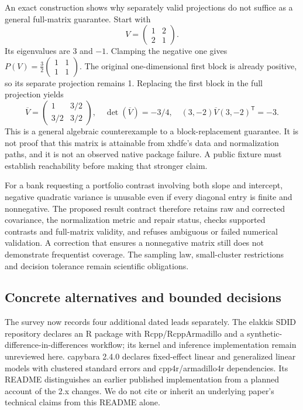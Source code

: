 An exact construction shows why separately valid projections do not suffice
as a general full-matrix guarantee. Start with
\[
V=\begin{pmatrix}1&2\\2&1\end{pmatrix}.
\]
Its eigenvalues are 3 and $-1$. Clamping the negative one gives
$P(V)=\tfrac32\begin{pmatrix}1&1\\1&1\end{pmatrix}$. The original
one-dimensional first block is already positive, so its separate projection
remains 1. Replacing the first block in the full projection yields
\[
\overline V=\begin{pmatrix}1&3/2\\3/2&3/2\end{pmatrix},
\quad\det(\overline V)=-3/4,
\quad (3,-2)\overline V(3,-2)^\mathsf{T}=-3.
\]
This is a general algebraic counterexample to a block-replacement guarantee.
It is not proof that this matrix is attainable from xhdfe's data and
normalization paths, and it is not an observed native package failure.
A public fixture must establish reachability before making that stronger
claim.\citep{exec25_panelcxx_reference}

For a bank requesting a portfolio contrast involving both slope and
intercept, negative quadratic variance is unusable even if every diagonal
entry is finite and nonnegative. The proposed result contract therefore
retains raw and corrected covariance, the normalization metric and repair
status, checks supported contrasts and full-matrix validity, and refuses
ambiguous or failed numerical validation. A correction that ensures a
nonnegative matrix still does not demonstrate frequentist coverage. The
sampling law, small-cluster restrictions and decision tolerance remain
scientific obligations.\citep{exec25_panelcxx_reference}

\subsection{Concrete alternatives and bounded decisions}
The survey now records four additional dated leads separately. The elakkis
SDID repository declares an R package with Rcpp/RcppArmadillo and a
synthetic-difference-in-differences workflow; its kernel and inference
implementation remain unreviewed here. capybara 2.4.0 declares fixed-effect
linear and generalized linear models with clustered standard errors and
cpp4r/armadillo4r dependencies. Its README distinguishes an earlier published
implementation from a planned account of the 2.x changes. We do not cite
or inherit an underlying paper's technical claims from this README alone.
\citep{exec25_panelcxx_sdid,exec25_panelcxx_capybara}

